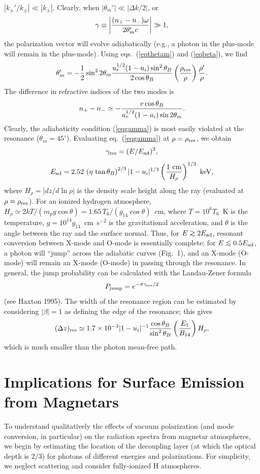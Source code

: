 \documentclass{aastex}
\def\be{\begin{equation}}
\def\ee{\end{equation}}
\def\go{\mathrel{\raise.3ex\hbox{$>$}\mkern-14mu
             \lower0.6ex\hbox{$\sim$}}}
\def\lo{\mathrel{\raise.3ex\hbox{$<$}\mkern-14mu
             \lower0.6ex\hbox{$\sim$}}}
\begin{document}
$|k_\pm'/k_\pm|\ll |k_\pm|$.
Clearly, when $|\theta_m'|\ll |\Delta k/2|$, or
\be
\gamma\equiv \left|{(n_+-n_-)\omega\over 2\theta_m'c}\right|\gg 1,
\label{eqgamma}\ee
the polarization vector will evolve adiabatically (e.g., a photon
in the plus-mode will remain in the plus-mode). Using
eqs.~(\ref{eqthetam}) and (\ref{eqbeta}), we find
\be
\theta_m'=-{1\over 2}\sin^2 2\theta_m {u_e^{1/2}(1-u_i)\sin^2\theta_B
\over 2\cos\theta_B}\left({\rho_{\rm res}\over\rho}\right){\rho'\over\rho}.
\ee
The difference in refractive indices of the two modes is
\be
n_+-n_-\simeq -{v\cos\theta_B\over u_e^{1/2}(1-u_i)\sin 2\theta_m}.
\ee
Clearly, the adiabaticity condition (\ref{eqgamma}) is most easily
violated at the resonance ($\theta_m=45^\circ$).
Evaluating eq.~(\ref{eqgamma}) at $\rho=\rho_{\rm res}$, we obtain
\be
\gamma_{\rm res}=(E/E_{\rm ad})^3,
\ee
\be
E_{\rm ad}=2.52\,\left(\eta\,\tan\theta_B\right)^{2/3}|1-u_i|^{1/3}
\left({1~{\rm cm}\over H_\rho}\right)^{1/3}~{\rm keV},
\ee
where $H_\rho=|dz/d\ln\rho|$ is the density scale height along the ray
(evaluated at $\rho=\rho_{\rm res}$).
For an ionized hydrogen atmosphere, $H_\rho\simeq
2kT/(m_p g\cos\theta)=1.65\,T_6/(g_{14}\cos\theta)$~cm,
where $T=10^6T_6$~K is the temperature, $g=10^{14}g_{14}$~cm~s$^{-2}$ is
the gravitational acceleration, and $\theta$ is the angle between the ray and
the surface normal. Thus, for $E\go 2E_{\rm ad}$, resonant
conversion between X-mode and O-mode is essentially complete;
for $E\lo 0.5E_{\rm ad}$, a photon will ``jump'' across the adiabatic
curves (Fig.~1), and an X-mode (O-mode) will remain an X-mode (O-mode)
in passing through the resonance. In general, the jump probability
can be calculated with the Landau-Zener formula
\be
P_{\rm jump}=e^{-\pi\gamma_{\rm res}/2}
\ee
(see Haxton 1995). The width of the resonance region
can be estimated by considering $|\beta|=1$ as defining
the edge of the resonance; this gives
\be
(\Delta z)_{\rm res}\simeq 1.7\times 10^{-3}|1-u_i|^{-1}
{\cos\theta_B\over\sin^2\theta_B}\left({E_1\over B_{14}}
\right)H_\rho,
\ee
which is much smaller than the photon mean-free path.

\section{Implications for Surface Emission from Magnetars}

To understand qualitatively the effects of vacuum polarization (and
mode conversion, in particular) on the radiation spectra from magnetar
atmospheres, we begin by estimating the location of the
decoupling layer (at which the optical depth is $2/3$)
for photons of different energies and polarizations.
For simplicity, we neglect scattering and consider fully-ionized
H atmospheres.
\end{document}

